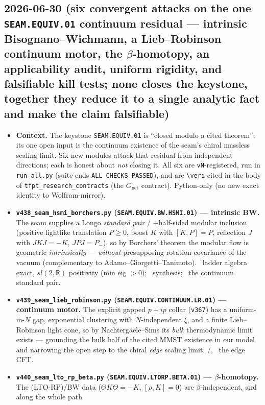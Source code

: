 \subsection*{2026-06-30 (six convergent attacks on the one \texttt{SEAM.EQUIV.01} continuum residual --- intrinsic Bisognano--Wichmann, a Lieb--Robinson continuum motor, the $\beta$-homotopy, an applicability audit, uniform rigidity, and falsifiable kill tests; none closes the keystone, together they reduce it to a single analytic fact and make the claim falsifiable)}
\begin{itemize}
\item \textbf{Context.} The keystone \texttt{SEAM.EQUIV.01} is ``closed modulo a cited theorem'': its one open
input is the continuum existence of the seam's chiral massless scaling limit. Six new modules attack that residual
from independent directions; each is honest about \emph{not} closing it. All six are \texttt{vN}-registered, run in
\texttt{run\_all.py} (suite ends \texttt{ALL CHECKS PASSED}), and are \texttt{\textbackslash veri}-cited in the
body of \texttt{tfpt\_research\_contracts} (the $G_{\mathrm{net}}$ contract). Python-only (no new exact identity to
Wolfram-mirror).
\item \textbf{\texttt{v438\_seam\_hsmi\_borchers.py} (\texttt{SEAM.EQUIV.BW.HSMI.01}) --- intrinsic BW.} The seam
supplies a Longo \emph{standard pair} / $+$half-sided modular inclusion (positive lightlike translation $P\ge0$,
boost $K$ with $[K,P]{=}P$, reflection $J$ with $JKJ{=}{-}K$, $JPJ{=}P_-$), so by Borchers' theorem the modular
flow is geometric \emph{intrinsically} --- \emph{without} presupposing rotation-covariance of the vacuum
(complementary to Adamo--Giorgetti--Tanimoto). \mE\ ladder algebra exact, $sl(2,\mathbb{R})$ positivity (min eig
$>0$); \mC\ synthesis; \mO\ the continuum standard pair.
\item \textbf{\texttt{v439\_seam\_lieb\_robinson.py} (\texttt{SEAM.EQUIV.CONTINUUM.LR.01}) --- continuum motor.}
The explicit gapped $p{+}ip$ collar (\texttt{v367}) has a uniform-in-$N$ gap, exponential clustering with
$N$-independent $\xi$, and a finite Lieb--Robinson light cone, so by Nachtergaele--Sims its \emph{bulk}
thermodynamic limit exists --- grounding the bulk half of the cited MMST existence in our model and narrowing the
open step to the chiral \emph{edge} scaling limit. \mE/\mC, \mO\ the edge CFT.
\item \textbf{\texttt{v440\_seam\_lto\_rp\_beta.py} (\texttt{SEAM.EQUIV.LTORP.BETA.01}) --- $\beta$-homotopy.}
The (LTO-RP)/BW data ($\Theta K\Theta{=}{-}K$, $[\rho,K]{=}0$) are $\beta$-independent, and along the whole path

\end{itemize}
